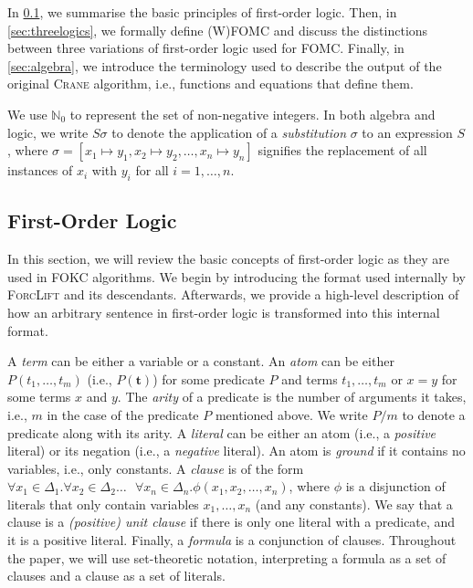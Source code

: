 \documentclass[a4paper,UKenglish,cleveref, autoref, thm-restate]{lipics-v2021}
\begin{document}

In \cref{sec:logic}, we summarise the basic principles of first-order logic.
Then, in \cref{sec:threelogics}, we formally define (W)FOMC and discuss the
distinctions between three variations of first-order logic used for FOMC.\@
Finally, in \cref{sec:algebra}, we introduce the terminology used to describe
the output of the original \textsc{Crane} algorithm, i.e., functions and
equations that define them.

We use $\mathbb{N}_{0}$ to represent the set of non-negative integers. In both
algebra and logic, we write $S\sigma$ to denote the application of a
\emph{substitution} $\sigma$ to an expression $S$, where
$\sigma = [x_{1} \mapsto y_{1}, x_{2} \mapsto y_{2}, \dots, x_{n} \mapsto y_{n}]$
signifies the replacement of all instances of $x_{i}$ with $y_{i}$ for all
$i = 1, \dots, n$.

\subsection{First-Order Logic}\label{sec:logic}

In this section, we will review the basic concepts of first-order logic as they
are used in FOKC algorithms. We begin by introducing the format used internally
by \textsc{ForcLift} and its descendants. Afterwards, we provide a high-level
description of how an arbitrary sentence in first-order logic is transformed
into this internal format.

A \emph{term} can be either a variable or a constant. An \emph{atom} can be
either $P(t_{1}, \dots, t_{m})$ (i.e., $P(\mathbf{t})$) for some predicate $P$
and terms $t_{1}, \dots, t_{m}$ or $x=y$ for some terms $x$ and $y$. The
\emph{arity} of a predicate is the number of arguments it takes, i.e., $m$ in
the case of the predicate $P$ mentioned above. We write $P/m$ to denote a
predicate along with its arity. A \emph{literal} can be either an atom (i.e., a
\emph{positive} literal) or its negation (i.e., a \emph{negative} literal). An
atom is \emph{ground} if it contains no variables, i.e., only constants. A
\emph{clause} is of the form $\forall x_{1} \in \Delta_{1}\text{.
}\forall x_{2} \in \Delta_{2}\dots\text{ }\forall x_{n} \in \Delta_{n}\text{.
}\phi(x_{1}, x_{2}, \dots, x_{n})$, where $\phi$ is a disjunction of literals
that only contain variables $x_{1}, \dots, x_{n}$ (and any constants). We say
that a clause is a \emph{(positive) unit clause} if there is only one literal
with a predicate, and it is a positive literal. Finally, a \emph{formula} is a
conjunction of clauses. Throughout the paper, we will use set-theoretic
notation, interpreting a formula as a set of clauses and a clause as a set of
literals.
\end{document}

